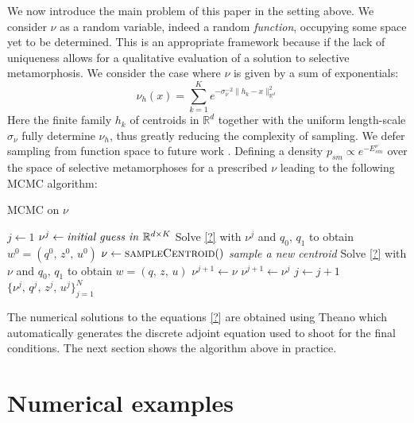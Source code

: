 \documentclass[runningheads]{llncs}
\newcommand{\Rd}{\mathbb{R}^{d}}
\newcommand{\RdK}{\mathbb{R}^{d\times K}}
\begin{document}
We now introduce the main problem of this paper in the setting above. We
consider $\nu$ as a random variable, indeed a random \emph{function}, occupying
some space yet to be determined. This is an appropriate framework because if the
lack of uniqueness allows for a qualitative evaluation of a solution to
selective metamorphosis. We consider the case where $\nu$ is given by a sum of
exponentials:
\begin{equation}
    \nu_h (x) = \sum_{k=1}^K e^{ -\sigma_\nu^{-2}\|h_k - x\|_{\Rd}^2}
\end{equation}
Here the finite family $h_k$ of centroids in $\Rd$ together with the uniform
length-scale $\sigma_\nu$ fully determine $\nu_h$, thus greatly reducing the
complexity of sampling. We defer sampling from function space to future work
\cite{.}. Defining a density $p_{sm} \propto e^{- E_{sm}^\nu}$ over the space of
selective metamorphoses for a prescribed $\nu$ leading to the following MCMC
algorithm:

\newcommand{\mhsample}{\textsc{sampleCentroid}}
\newcommand{\acceptprob}{\textsc{accept}}
\begin{algorithm}[h!]
\begin{algorithmic}
\caption{MCMC on $\nu$}\label{algo:mcmc}
\State $j \gets 1$
\State $\nu^j \gets \text{\emph{initial guess in} } \RdK$
\State Solve \eqref{?} with $\nu^j$ and $q_0,\,q_1$ to obtain $w^0 = (q^0,\, z^0,\, u^0)$
\State $\nu \gets \mhsample ()$\hspace{3cm} \emph{sample a new centroid}
\State Solve \eqref{?} with $\nu$ and $q_0,\,q_1$ to obtain $w = (q,\, z,\, u)$
    \State $\nu^{j+1} \gets \nu$
\Else
    \State $\nu^{j+1} \gets \nu^j$
\EndIf
\State $j\gets j+1$
\EndWhile
\Return $\{\nu^j,\, q^j,\, z^j,\, u^j\}_{j=1}^N$
\EndProcedure
\end{algorithmic}
\end{algorithm}

The numerical solutions to the equations \eqref{?} are obtained using Theano
\cite{team2016theano} which automatically generates the discrete adjoint
equation used to shoot for the final conditions. The next section shows the
algorithm above in practice.

\section{Numerical examples}\label{sec:numerical}
\end{document}
